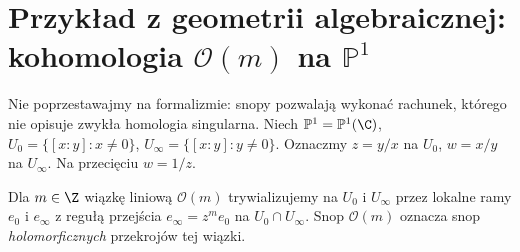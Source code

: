 \section{Przykład z geometrii algebraicznej: kohomologia \texorpdfstring{$\mathcal O(m)$}{O(m)} na \texorpdfstring{$\mathbb P^1$}{P1}}
\label{sec:p1-sheaf-v12}
Nie poprzestawajmy na formalizmie: snopy pozwalają
wykonać rachunek, którego nie opisuje zwykła homologia
singularna. Niech $\mathbb P^1=\mathbb P^1(\C)$,
$U_0=\{[x:y]:x\ne0\}$, $U_\infty=\{[x:y]:y\ne0\}$.
Oznaczmy $z=y/x$ na $U_0$, $w=x/y$ na $U_\infty$.
Na przecięciu $w=1/z$.

\begin{definicja}
Dla $m\in\Z$ wiązkę liniową $\mathcal O(m)$
trywializujemy na $U_0$ i $U_\infty$ przez
lokalne ramy $e_0$ i $e_\infty$ z regułą przejścia
$e_\infty=z^m e_0$ na $U_0\cap U_\infty$.
Snop $\mathcal O(m)$ oznacza snop \emph{holomorficznych}
przekrojów tej wiązki.
\end{definicja}


